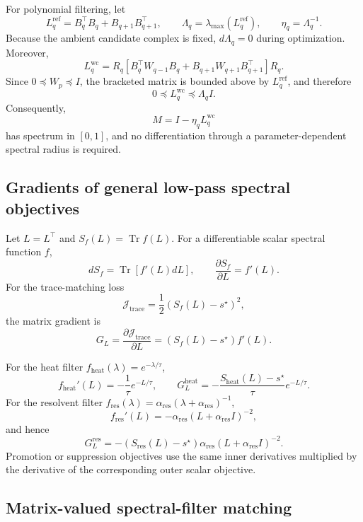 \documentclass[pdflatex,sn-mathphys-num]{sn-jnl}%
\theoremstyle{thmstyleone}%
\theoremstyle{thmstyletwo}%
\theoremstyle{thmstylethree}%
\begin{document}
\begin{appendices}
For polynomial filtering, let
\[
L_q^{\mathrm{ref}}
=
B_q^\top B_q+B_{q+1}B_{q+1}^\top,
\qquad
\Lambda_q
=
\lambda_{\max}(L_q^{\mathrm{ref}}),
\qquad
\eta_q=\Lambda_q^{-1}.
\]
Because the ambient candidate complex is fixed, \(d\Lambda_q=0\) during optimization. Moreover,
\[
L_q^{\mathrm{wc}}
=
R_q
\left[
B_q^\top W_{q-1}B_q
+
B_{q+1}W_{q+1}B_{q+1}^\top
\right]
R_q.
\]
Since \(0\preceq W_p\preceq I\), the bracketed matrix is bounded above by
\(L_q^{\mathrm{ref}}\), and therefore
\[
0\preceq L_q^{\mathrm{wc}}\preceq \Lambda_q I.
\]
Consequently,
\[
M=I-\eta_qL_q^{\mathrm{wc}}
\]
has spectrum in \([0,1]\), and no differentiation through a parameter-dependent spectral radius is required.

\subsection{Gradients of general low-pass spectral objectives}

Let \(L=L^\top\) and \(S_f(L)=\operatorname{Tr}f(L)\). For a differentiable scalar spectral function \(f\),
\[
dS_f
=
\operatorname{Tr}[f'(L)dL],
\qquad
\frac{\partial S_f}{\partial L}
=
f'(L).
\]
For the trace-matching loss
\[
\mathcal J_{\mathrm{trace}}
=
\frac12\left(S_f(L)-s^\star\right)^2,
\]
the matrix gradient is
\[
G_L
=
\frac{\partial\mathcal J_{\mathrm{trace}}}{\partial L}
=
\left(S_f(L)-s^\star\right)f'(L).
\]

For the heat filter
\(f_{\mathrm{heat}}(\lambda)=e^{-\lambda/\tau}\),
\[
f_{\mathrm{heat}}'(L)
=
-\frac1\tau e^{-L/\tau},
\qquad
G_L^{\mathrm{heat}}
=
-\frac{S_{\mathrm{heat}}(L)-s^\star}{\tau}
e^{-L/\tau}.
\]
For the resolvent filter
\(f_{\mathrm{res}}(\lambda)
=
\alpha_{\mathrm{res}}(\lambda+\alpha_{\mathrm{res}})^{-1}\),
\[
f_{\mathrm{res}}'(L)
=
-\alpha_{\mathrm{res}}
(L+\alpha_{\mathrm{res}}I)^{-2},
\]
and hence
\[
G_L^{\mathrm{res}}
=
-\left(S_{\mathrm{res}}(L)-s^\star\right)
\alpha_{\mathrm{res}}
(L+\alpha_{\mathrm{res}}I)^{-2}.
\]
Promotion or suppression objectives use the same inner derivatives multiplied by the derivative of the corresponding outer scalar objective.

\subsection{Matrix-valued spectral-filter matching}


\end{appendices}
\end{document}

